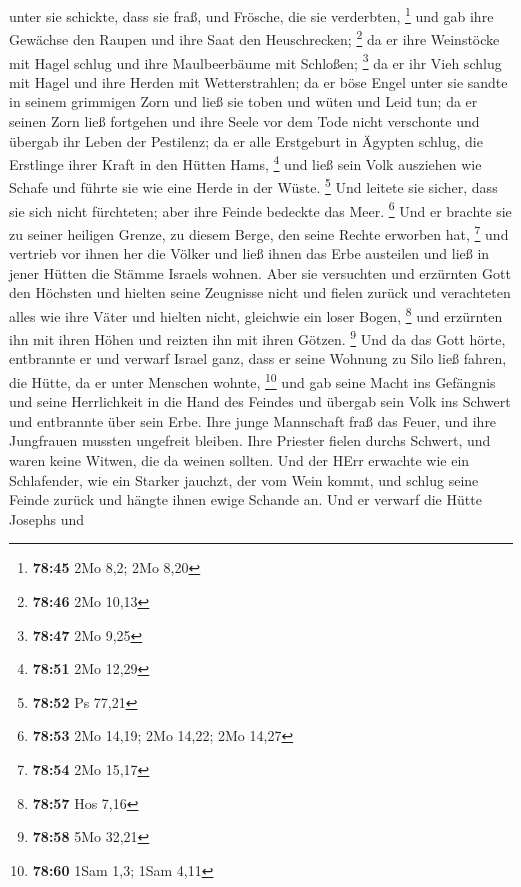 unter sie schickte, dass sie fraß, und Frösche, die sie verderbten,
\footnote{\textbf{78:45} 2Mo 8,2; 2Mo 8,20}  und gab ihre
Gewächse den Raupen und ihre Saat den Heuschrecken; \footnote{\textbf{78:46}
  2Mo 10,13}  da er ihre Weinstöcke mit Hagel schlug und
ihre Maulbeerbäume mit Schloßen; \footnote{\textbf{78:47} 2Mo 9,25}
 da er ihr Vieh schlug mit Hagel und ihre Herden mit
Wetterstrahlen;  da er böse Engel unter sie sandte in
seinem grimmigen Zorn und ließ sie toben und wüten und Leid tun;
 da er seinen Zorn ließ fortgehen und ihre Seele vor dem
Tode nicht verschonte und übergab ihr Leben der Pestilenz;
 da er alle Erstgeburt in Ägypten schlug, die Erstlinge
ihrer Kraft in den Hütten Hams, \footnote{\textbf{78:51} 2Mo 12,29}
 und ließ sein Volk ausziehen wie Schafe und führte sie
wie eine Herde in der Wüste. \footnote{\textbf{78:52} Ps 77,21}
 Und leitete sie sicher, dass sie sich nicht fürchteten;
aber ihre Feinde bedeckte das Meer. \footnote{\textbf{78:53} 2Mo 14,19;
  2Mo 14,22; 2Mo 14,27}  Und er brachte sie zu seiner
heiligen Grenze, zu diesem Berge, den seine Rechte erworben hat,
\footnote{\textbf{78:54} 2Mo 15,17}  und vertrieb vor
ihnen her die Völker und ließ ihnen das Erbe austeilen und ließ in jener
Hütten die Stämme Israels wohnen.  Aber sie versuchten
und erzürnten Gott den Höchsten und hielten seine Zeugnisse nicht
 und fielen zurück und verachteten alles wie ihre Väter
und hielten nicht, gleichwie ein loser Bogen, \footnote{\textbf{78:57}
  Hos 7,16}  und erzürnten ihn mit ihren Höhen und
reizten ihn mit ihren Götzen. \footnote{\textbf{78:58} 5Mo 32,21}
 Und da das Gott hörte, entbrannte er und verwarf Israel
ganz,  dass er seine Wohnung zu Silo ließ fahren, die
Hütte, da er unter Menschen wohnte, \footnote{\textbf{78:60} 1Sam 1,3;
  1Sam 4,11}  und gab seine Macht ins Gefängnis und seine
Herrlichkeit in die Hand des Feindes  und übergab sein
Volk ins Schwert und entbrannte über sein Erbe.  Ihre
junge Mannschaft fraß das Feuer, und ihre Jungfrauen mussten ungefreit
bleiben.  Ihre Priester fielen durchs Schwert, und waren
keine Witwen, die da weinen sollten.  Und der HErr
erwachte wie ein Schlafender, wie ein Starker jauchzt, der vom Wein
kommt,  und schlug seine Feinde zurück und hängte ihnen
ewige Schande an.  Und er verwarf die Hütte Josephs und

